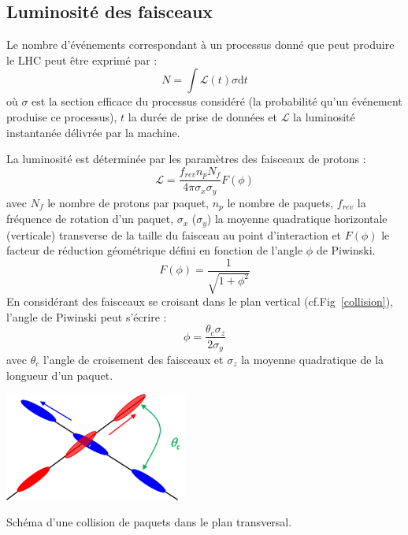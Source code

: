 \subsection{Luminosité des faisceaux}
Le nombre d'événements correspondant à un processus donné que peut produire le LHC peut être exprimé par :
\begin{equation}
N=\int \mathcal{L}(t)\sigma \mathrm dt
\end{equation}
où $\sigma$ est la section efficace du processus considéré (la probabilité qu'un événement produise ce processus), $t$ la durée de prise de données et $\mathcal{L}$ la luminosité instantanée délivrée par la machine.

La luminosité est déterminée par les paramètres des faisceaux de protons :
\begin{equation}
\mathcal{L}=\frac{f_{rev}n_{p}N_{f}}{4\pi \sigma_{x} \sigma_{y}} F(\phi)
\end{equation}
avec $N_{f}$ le nombre de protons par paquet, $n_{p}$ le nombre de paquets, $f_{rev}$ la fréquence de rotation d'un paquet, $\sigma_{x}$ ($\sigma_{y}$) la moyenne quadratique horizontale (verticale) transverse de la taille du faisceau au point d'interaction et $F(\phi)$ le facteur de réduction géométrique défini en fonction de l'angle $\phi$ de Piwinski.
\begin{equation}
F(\phi)=\frac{1}{\sqrt{1+\phi^{2}}}
\end{equation}
En considérant des faisceaux se croisant dans le plan vertical (cf.Fig~\ref{collision}), l'angle de Piwinski peut s'écrire :
\begin{equation}
\phi=\frac{\theta_{c}\sigma_{z}}{2\sigma_{y}}
\end{equation}
avec $\theta_{c}$ l'angle de croisement des faisceaux et $\sigma_{z}$ la moyenne quadratique de la longueur d'un paquet.


\begin{minipagewithmarginpars}[ht!]{0.95\textwidth}
\centering
\includegraphics[width=0.45\textwidth]{LHC/collision.png}
\captionsetup{type=figure}\caption{Schéma d'une collision de paquets dans le plan transversal.}
\label{collision}	
\end{minipagewithmarginpars}

